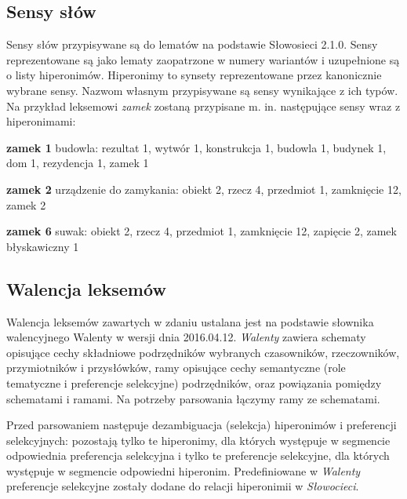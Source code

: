 \documentclass[oneside,pwrcover,withmarginpar,hidelinks,11pt]{article}
\begin{document}
\subsection{Sensy słów}
Sensy słów przypisywane są do lematów na podstawie Słowosieci 2.1.0.
Sensy reprezentowane są jako lematy zaopatrzone w numery wariantów i 
uzupełnione są o listy hiperonimów.
Hiperonimy to synsety reprezentowane przez kanonicznie wybrane sensy.
Nazwom własnym przypisywane są sensy wynikające z ich typów.    
Na przykład leksemowi {\it zamek} zostaną przypisane m. in. następujące sensy wraz z hiperonimami:
\begin{description}
\item{\bf zamek 1} budowla: rezultat 1, wytwór 1, konstrukcja 1, budowla 1, budynek 1, dom 1, rezydencja 1, zamek 1
\item{\bf zamek 2} urządzenie do zamykania: obiekt 2, rzecz 4, przedmiot 1, zamknięcie 12, zamek 2
\item{\bf zamek 6} suwak: obiekt 2, rzecz 4, przedmiot 1, zamknięcie 12, zapięcie 2, zamek błyskawiczny 1
\end{description}

\subsection{Walencja leksemów}
Walencja leksemów zawartych w zdaniu ustalana jest na podstawie
słownika walencyjnego Walenty w wersji dnia 2016.04.12.
{\it Walenty} zawiera schematy opisujące cechy składniowe podrzędników wybranych czasowników, rzeczowników, przymiotników i przysłówków,
ramy opisujące cechy semantyczne (role tematyczne i preferencje selekcyjne) podrzędników,
oraz powiązania pomiędzy schematami i ramami.
Na potrzeby parsowania łączymy ramy ze schematami.

Przed parsowaniem następuje dezambiguacja (selekcja) hiperonimów i preferencji selekcyjnych:
pozostają tylko te hiperonimy, dla których występuje w segmencie odpowiednia preferencja selekcyjna
i tylko te preferencje selekcyjne, dla których występuje w segmencie odpowiedni hiperonim.
Predefiniowane w {\it Walenty} preferencje selekcyjne zostały dodane do relacji hiperonimii w {\it Słowocieci}.
\end{document}
